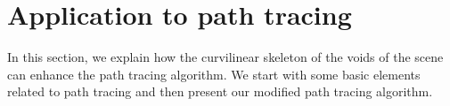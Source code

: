 \section{Application to path tracing}
\label{sec::appli_pathtrace}

In this section, we explain how the curvilinear skeleton of the voids of the scene can enhance the path tracing algorithm. We start with some basic elements related to path tracing and then present our modified path tracing algorithm.

%
%
%
%
%
%
%
%
%
%
%
